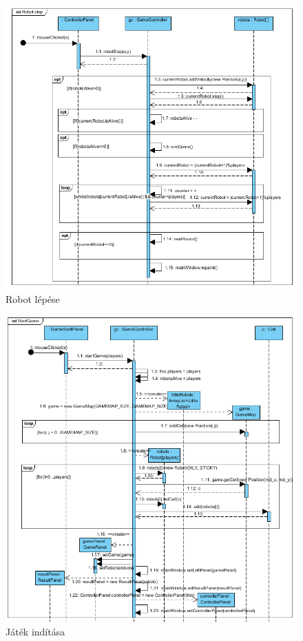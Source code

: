 \begin{figure}[h]
	\begin{center}
		\includegraphics[width=18cm]{chapters/chapter11/robotstep.png}
		\caption{Robot lépése}
		\label{fig:Grafika}
	\end{center}
\end{figure}
\clearpage
\begin{figure}[h]
	\begin{center}
		\includegraphics[width=18cm]{chapters/chapter11/startgame.png}
		\caption{Játék indítása}
		\label{fig:Grafika}
	\end{center}
\end{figure}
\clearpage



